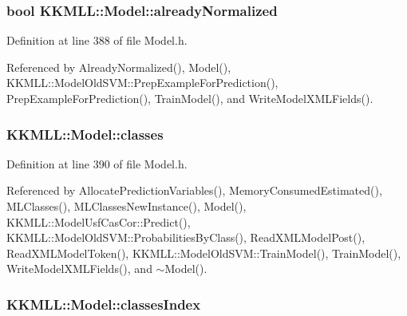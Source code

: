 \subsubsection[{\texorpdfstring{already\+Normalized}{alreadyNormalized}}]{\setlength{\rightskip}{0pt plus 5cm}bool K\+K\+M\+L\+L\+::\+Model\+::already\+Normalized\hspace{0.3cm}{\ttfamily [protected]}}\hypertarget{class_k_k_m_l_l_1_1_model_a56de637fe285bd31edb55f0eaca5fbb7}{}\label{class_k_k_m_l_l_1_1_model_a56de637fe285bd31edb55f0eaca5fbb7}


Definition at line 388 of file Model.\+h.



Referenced by Already\+Normalized(), Model(), K\+K\+M\+L\+L\+::\+Model\+Old\+S\+V\+M\+::\+Prep\+Example\+For\+Prediction(), Prep\+Example\+For\+Prediction(), Train\+Model(), and Write\+Model\+X\+M\+L\+Fields().

\subsubsection[{\texorpdfstring{classes}{classes}}]{ K\+K\+M\+L\+L\+::\+Model\+::classes\hspace{0.3cm}{\ttfamily [protected]}}\hypertarget{class_k_k_m_l_l_1_1_model_a764e7680f07814c3c5313dc4e4de60a1}{}\label{class_k_k_m_l_l_1_1_model_a764e7680f07814c3c5313dc4e4de60a1}


Definition at line 390 of file Model.\+h.



Referenced by Allocate\+Prediction\+Variables(), Memory\+Consumed\+Estimated(), M\+L\+Classes(), M\+L\+Classes\+New\+Instance(), Model(), K\+K\+M\+L\+L\+::\+Model\+Usf\+Cas\+Cor\+::\+Predict(), K\+K\+M\+L\+L\+::\+Model\+Old\+S\+V\+M\+::\+Probabilities\+By\+Class(), Read\+X\+M\+L\+Model\+Post(), Read\+X\+M\+L\+Model\+Token(), K\+K\+M\+L\+L\+::\+Model\+Old\+S\+V\+M\+::\+Train\+Model(), Train\+Model(), Write\+Model\+X\+M\+L\+Fields(), and $\sim$\+Model().

\subsubsection[{\texorpdfstring{classes\+Index}{classesIndex}}]{ K\+K\+M\+L\+L\+::\+Model\+::classes\+Index\hspace{0.3cm}{\ttfamily [protected]}}\hypertarget{class_k_k_m_l_l_1_1_model_adbb9475e16bb2c3eef52170485e3018e}{}\label{class_k_k_m_l_l_1_1_model_adbb9475e16bb2c3eef52170485e3018e}


